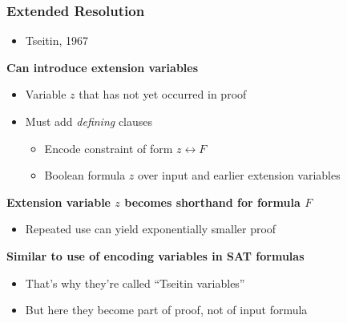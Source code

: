 \documentclass[t,pdf]{beamer}
\begin{document}
\begin{frame}
  \frametitle{Extended Resolution}
  
\begin{itemize}
\item Tseitin, 1967
\end{itemize}

{\bf Can introduce extension variables}
\begin{itemize}
\item Variable $z$ that has not yet occurred in proof
\item Must add {\em defining} clauses
\begin{itemize}
\item Encode constraint of form $z \leftrightarrow F$
\item Boolean formula $z$ over input and earlier extension variables
\end{itemize}
\end{itemize}

\vspace{20pt}

{\bf Extension variable $z$ becomes shorthand for formula $F$}
  \begin{itemize}
  \item Repeated use can yield exponentially smaller proof
  \end{itemize}

  {\bf Similar to use of encoding variables in SAT formulas}
  \begin{itemize}
  \item That's why they're called ``Tseitin variables''
  \item But here they become part of proof, not of input formula
  \end{itemize}

\end{frame}
\end{document}
